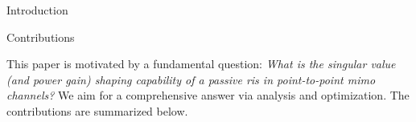 \documentclass[journal]{IEEEtran}
\begin{document}
\begin{section}{Introduction}
\begin{subsection}{Contributions}


		This paper is motivated by a fundamental question:
		\emph{What is the singular value (and power gain) shaping capability of a passive \gls{ris} in point-to-point \gls{mimo} channels?}
		We aim for a comprehensive answer via analysis and optimization.
		The contributions are summarized below.





\end{subsection}
\end{section}
\end{document}
